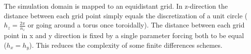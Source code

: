 \documentclass[master.tex]{subfiles}
\begin{document}
The simulation domain is mapped to an equidistant grid. In z-direction the distance between each grid point simply equals the discretization of a unit circle ($h_z= \frac{2\pi}{n_z}$ or going around a torus once toroidally). The distance between each grid point in x and y direction is fixed by a single parameter forcing both to be equal ($h_x = h_y$). This reduces the complexity of some finite differences schemes. 
\end{document}
